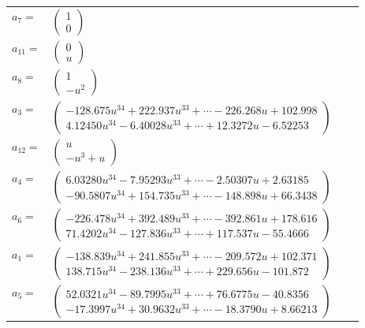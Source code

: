 \documentclass[1p]{elsarticle_modified}
\theoremstyle{definition}
\begin{document}
\begin{tabular}{m{7pt} m{180pt} m{7pt} m{180pt} }
\flushright $a_{7}=$&$\begin{pmatrix}1\\0\end{pmatrix}$ \\
\flushright $a_{11}=$&$\begin{pmatrix}0\\u\end{pmatrix}$ \\
\flushright $a_{8}=$&$\begin{pmatrix}1\\- u^2\end{pmatrix}$ \\
\flushright $a_{3}=$&$\begin{pmatrix}-128.675 u^{34}+222.937 u^{33}+\cdots-226.268 u+102.998\\4.12450 u^{34}-6.40028 u^{33}+\cdots+12.3272 u-6.52253\end{pmatrix}$ \\
\flushright $a_{12}=$&$\begin{pmatrix}u\\- u^3+u\end{pmatrix}$ \\
\flushright $a_{4}=$&$\begin{pmatrix}6.03280 u^{34}-7.95293 u^{33}+\cdots-2.50307 u+2.63185\\-90.5807 u^{34}+154.735 u^{33}+\cdots-148.898 u+66.3438\end{pmatrix}$ \\
\flushright $a_{6}=$&$\begin{pmatrix}-226.478 u^{34}+392.489 u^{33}+\cdots-392.861 u+178.616\\71.4202 u^{34}-127.836 u^{33}+\cdots+117.537 u-55.4666\end{pmatrix}$ \\
\flushright $a_{1}=$&$\begin{pmatrix}-138.839 u^{34}+241.855 u^{33}+\cdots-209.572 u+102.371\\138.715 u^{34}-238.136 u^{33}+\cdots+229.656 u-101.872\end{pmatrix}$ \\
\flushright $a_{5}=$&$\begin{pmatrix}52.0321 u^{34}-89.7995 u^{33}+\cdots+76.6775 u-40.8356\\-17.3997 u^{34}+30.9632 u^{33}+\cdots-18.3790 u+8.66213\end{pmatrix}$ \\

\end{tabular}
\end{document}
